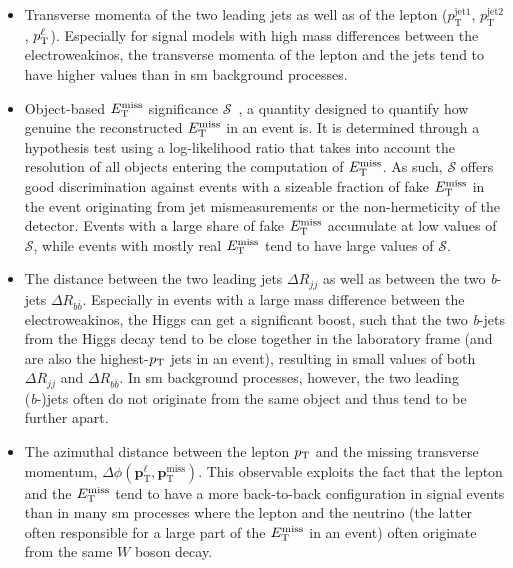 \begin{itemize}
	\item Transverse momenta of the two leading jets as well as of the lepton ($p_\textrm{T}^\mathrm{jet1}$, $p_\textrm{T}^\mathrm{jet2}$, $p^\ell_{\textrm{T}}$). Especially for signal models with high mass differences between the electroweakinos, the transverse momenta of the lepton and the jets tend to have higher values than in \gls{sm} background processes.
	\item Object-based $E_{\textrm{T}}^{\textrm{miss}}$ significance $\mathcal{S}$~\cite{met_significance:2294922}, a quantity designed to quantify how genuine the reconstructed $E_{\textrm{T}}^{\textrm{miss}}$ in an event is. It is determined through a hypothesis test using a log-likelihood ratio that takes into account the resolution of all objects entering the computation of $E_{\textrm{T}}^{\textrm{miss}}$. As such, $\mathcal{S}$ offers good discrimination against events with a sizeable fraction of fake $E_{\textrm{T}}^{\textrm{miss}}$ in the event originating \eg from jet mismeasurements or the non-hermeticity of the detector. Events with a large share of fake $E_{\textrm{T}}^{\textrm{miss}}$ accumulate at low values of $\mathcal{S}$, while events with mostly real $E_{\textrm{T}}^{\textrm{miss}}$ tend to have large values of $\mathcal{S}$. 
	\item The distance between the two leading jets $\Delta R_{jj}$ as well as between the two \textit{b}-jets $\Delta R_{b\bar{b}}$. Especially in events with a large mass difference between the electroweakinos, the Higgs can get a significant boost, such that the two \textit{b}-jets from the Higgs decay tend to be close together in the laboratory frame (and are also the highest-$p_{\textrm{T}}$ jets in an event), resulting in small values of both $\Delta R_{jj}$ and $\Delta R_{b\bar{b}}$. In \gls{sm} background processes, however, the two leading (\textit{b}-)jets often do not originate from the same object and thus tend to be further apart.
	\item The azimuthal distance between the lepton $p_{\textrm{T}}$ and the missing transverse momentum, $\Delta \phi (\boldsymbol{p}_\mathrm{T}^\ell, \boldsymbol{p}_\mathrm{T}^\mathrm{miss})$. This observable exploits the fact that the lepton and the $E_{\textrm{T}}^{\textrm{miss}}$ tend to have a more back-to-back configuration in signal events than in many \gls{sm} processes where the lepton and the neutrino (the latter often responsible for a large part of the $E_{\textrm{T}}^{\textrm{miss}}$ in an event) often originate from the same $W$ boson decay.
\end{itemize}


